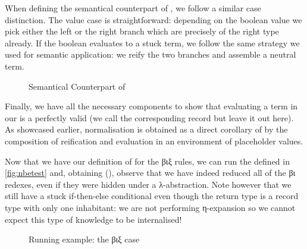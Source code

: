 When defining the semantical counterpart of , we follow a similar
case distinction.
%
The value case is straightforward: depending on the boolean value we
pick either the left or the right branch which are precisely of the right
type already.
%
If the boolean evaluates to a stuck term, we follow the same strategy we
used for semantic application: we reify the two branches and assemble a
neutral term.

\begin{figure}[h]
\caption{Semantical Counterpart of }
\end{figure}

Finally, we have all the necessary components to show that evaluating
a term in our  is a perfectly valid  (we call
the corresponding  record  but leave it out here).
%
As showcased earlier, normalisation is obtained as a direct corollary of
 by the composition of reification and evaluation in an environment
of placeholder values.


Now that we have our definition of  for the βιξ rules, we
can run the  defined in \cref{fig:nbetest} and, obtaining
(),
observe that
we have indeed reduced all of the βι redexes, even if they were
hidden under a λ-abstraction. Note however that we still have a stuck
if-then-else conditional even though the return type is a record type
with only one inhabitant: we are not performing η-expansion so we cannot
expect this type of knowledge to be internalised!

\begin{figure}[h]
\caption{Running example: the βιξ case}\label{fig:betaiotaxitest}
\end{figure}
